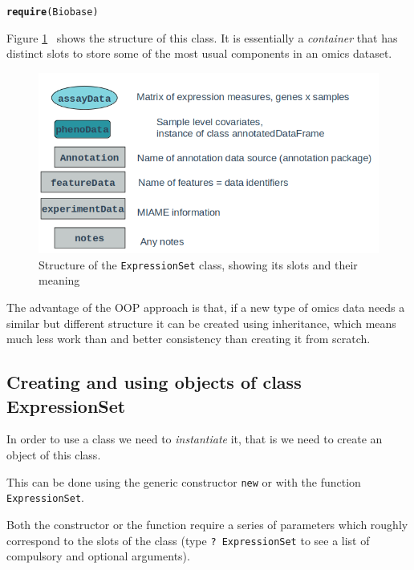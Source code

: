 \documentclass[a4paper]{article}\usepackage[]{graphicx}\usepackage[]{color}
\makeatletter
\newcommand{\hlstd}[1]{\textcolor[rgb]{0.345,0.345,0.345}{#1}}%
\newcommand{\hlkwd}[1]{\textcolor[rgb]{0.737,0.353,0.396}{\textbf{#1}}}%
\newenvironment{kframe}{%
 \def\at@end@of@kframe{}%
 \ifinner\ifhmode%
  \def\at@end@of@kframe{\end{minipage}}%
  \begin{minipage}{\columnwidth}%
 \fi\fi%
 \def\FrameCommand##1{\hskip\@totalleftmargin \hskip-\fboxsep
 \colorbox{shadecolor}{##1}\hskip-\fboxsep
     \hskip-\linewidth \hskip-\@totalleftmargin \hskip\columnwidth}%
 \MakeFramed {\advance\hsize-\width
   \@totalleftmargin\z@ \linewidth\hsize
   \@setminipage}}%
 {\par\unskip\endMakeFramed%
 \at@end@of@kframe}
\newenvironment{knitrout}{}{} %
\makeatother
\begin{document}
\begin{knitrout}
\color{fgcolor}\begin{kframe}
\begin{alltt}
\hlkwd{require}\hlstd{(Biobase)}
\end{alltt}
\end{kframe}
\end{knitrout}

Figure \ref{fig:ExpressionSet}~ shows the structure of this class. It is essentially a \emph{container} that has distinct slots to store some of the most usual components in an omics dataset.

\begin{figure}
\includegraphics[width=\textwidth]{"ExpressionSet"}
\caption{Structure of the \texttt{ExpressionSet} class, showing its slots and their meaning\label{fig:ExpressionSet}}
\end{figure}

The advantage of the OOP approach is that, if a new type of omics data needs a similar but different structure it can be created using inheritance, which means much less work than and better consistency than creating it from scratch.

\subsection{Creating and using objects of class ExpressionSet}

In order to use a class we need to \emph{instantiate} it, that is we need to create an object of this class.

This can be done using the generic constructor \texttt{new} or with the function \texttt{ExpressionSet}.

Both the constructor or the function require a series of parameters which roughly correspond to the slots of the class (type \texttt{? ExpressionSet} to see a list of compulsory and optional arguments).
\end{document}
